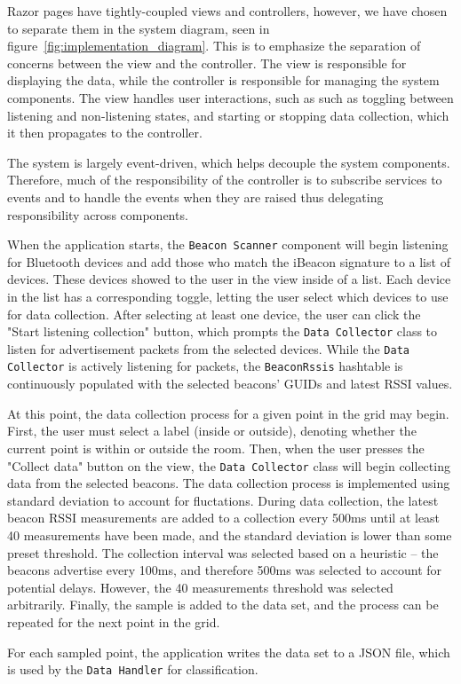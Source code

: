 Razor pages have tightly-coupled views and controllers, however, we have chosen to separate them in the system diagram, seen in figure~\ref{fig:implementation_diagram}. This is to emphasize the separation of concerns between the view and the controller. The view is responsible for displaying the data, while the controller is responsible for managing the system components. The view handles user interactions, such as such as toggling between listening and non-listening states, and starting or stopping data collection, which it then propagates to the controller.

The system is largely event-driven, which helps decouple the system components. 
Therefore, much of the responsibility of the controller is to subscribe services to events and to handle the events when they are raised thus delegating responsibility across components. 

When the application starts, the \texttt{Beacon Scanner} component will begin listening for Bluetooth devices and add those who match the iBeacon signature to a list of devices.
These devices showed to the user in the view inside of a list.
Each device in the list has a corresponding toggle, letting the user select which devices to use for data collection.
After selecting at least one device, the user can click the "Start listening collection" button, which prompts the \texttt{Data Collector} class to listen for advertisement packets from the selected devices. 
While the \texttt{Data Collector} is actively listening for packets, the \texttt{BeaconRssis} hashtable is continuously populated with the selected beacons' GUIDs and latest RSSI values.


At this point, the data collection process for a given point in the grid may begin.
First, the user must select a label (inside or outside), denoting whether the current point is within or outside the room.
Then, when the user presses the "Collect data" button on the view, the \texttt{Data Collector} class will begin collecting data from the selected beacons.
The data collection process is implemented using standard deviation to account for fluctations.
During data collection, the latest beacon RSSI measurements are added to a collection every 500ms until at least 40 measurements have been made, and the standard deviation is lower than some preset threshold. The collection interval was selected based on a heuristic -- the beacons advertise every 100ms, and therefore 500ms was selected to account for potential delays. However, the 40 measurements threshold was selected arbitrarily.
Finally, the sample is added to the data set, and the process can be repeated for the next point in the grid.

For each sampled point, the application writes the data set to a JSON file, which is used by the \texttt{Data Handler} for classification.